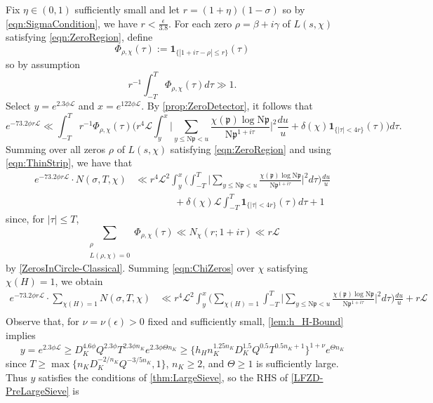 \documentclass[12pt,psamsfonts]{amsart}
\theoremstyle{definition}
\theoremstyle{remark}
\numberwithin{equation}{section}
\theoremstyle{plain}
\theoremstyle{remark}
\renewcommand{\1}{ {\bf 1}}
\newcommand{\cL}{\mathcal{L}}
\newcommand{\N}{\mathrm{N}}
\newcommand{\kp}{\mathfrak{p}}
\begin{document}
Fix $\eta \in (0,1)$ sufficiently small and let $r = (1+\eta)(1-\sigma)$ so by \eqref{eqn:SigmaCondition}, we have $r < \tfrac{\epsilon}{3.8}$.  For each zero $\rho = \beta+i\gamma$ of $L(s,\chi)$ satisfying \eqref{eqn:ZeroRegion}, define
\[
\Phi_{\rho, \chi}(\tau) := \mathbf{1}_{\{ |1+i\tau-\rho| \leq r\}}(\tau)
\]
so by assumption
\[
r^{-1} \int_{-T}^T \Phi_{\rho, \chi}(\tau) d\tau \gg 1.
\]
Select $y = e^{2.3\phi \cL}$ and $x = e^{122\phi \cL}$. By \cref{prop:ZeroDetector}, it follows that
\[
e^{-73.2 \phi r \cL} \ll \int_{-T}^T r^{-1} \Phi_{\rho,\chi}(\tau)  \Big( r^4 \cL  \int_y^x \Big| \sum_{y \leq \N\kp < u} \frac{\chi(\kp) \log \N \kp  }{\N\kp^{1+i\tau}}  \Big|^2  \frac{du}{u}  +  \delta(\chi) \mathbf{1}_{\{|\tau| < 4r\}}(\tau) \Big) d\tau.
\]
Summing over all zeros $\rho$ of $L(s,\chi)$ satisfying \eqref{eqn:ZeroRegion} and using  \eqref{eqn:ThinStrip}, we have that
\begin{equation}
	\label{eqn:ChiZeros}
	\begin{aligned}
	e^{-73.2\phi r\cL} \cdot N(\sigma, T,\chi) 
	& \ll r^4 \cL^2  \int_y^x \Big( \int_{-T}^T  \Big| \sum_{y \leq \N\kp < u} \frac{\chi(\kp) \log \N \kp  }{\N\kp^{1+i\tau}}  \Big|^2 d\tau  \Big) \frac{du}{u}   \\
	& \qquad\qquad +  \delta(\chi) \cL \int_{-T}^T \mathbf{1}_{\{|\tau| < 4r\}}(\tau)   d\tau	+ 1
	\end{aligned}
\end{equation}
since, for $|\tau| \leq T$, 
\[
\sum_{\substack{ \rho \\ L(\rho, \chi) = 0} } \Phi_{\rho,\chi}(\tau) \ll N_{\chi}(r; 1+i\tau) \ll r\cL
\]
by \cref{ZerosInCircle-Classical}. Summing \eqref{eqn:ChiZeros} over $\chi$ satisfying $\chi(H) = 1$, we obtain
\begin{equation}
	\begin{aligned}
	e^{-73.2 \phi r\cL} \cdot \sum_{\chi(H) = 1} N(\sigma, T,\chi) 
	& \ll r^4 \cL^2  \int_y^x \Big(\sum_{\chi(H)=1} \int_{-T}^T  \Big| \sum_{y \leq \N\kp < u} \frac{\chi(\kp) \log \N \kp  }{\N\kp^{1+i\tau}}  \Big|^2 d\tau  \Big) \frac{du}{u}  + r\cL\\
	\end{aligned}
	\label{LFZD-PreLargeSieve}
\end{equation}
Observe that, for $\nu = \nu(\epsilon) > 0$ fixed and sufficiently small, \cref{lem:h_H-Bound} implies
\[
y = e^{2.3\phi \cL} \geq D_K^{4.6\phi} Q^{2.3\phi} T^{2.3 \phi n_K} e^{2.3\phi \Theta n_K} \geq \{ h_H n_K^{1.25 n_K} D_K^{1.5} Q^{0.5} T^{0.5 n_K + 1} \} ^{1+\nu} e^{\Theta n_K}
\]
since $T \geq \max\{ n_K D_K^{-2/n_K} Q^{-3/5n_K}, 1\}$, $n_K \geq 2$, and $\Theta \geq 1$ is sufficiently large. Thus $y$ satisfies the conditions of \cref{thm:LargeSieve}, so the RHS of \eqref{LFZD-PreLargeSieve} is
\end{document}
